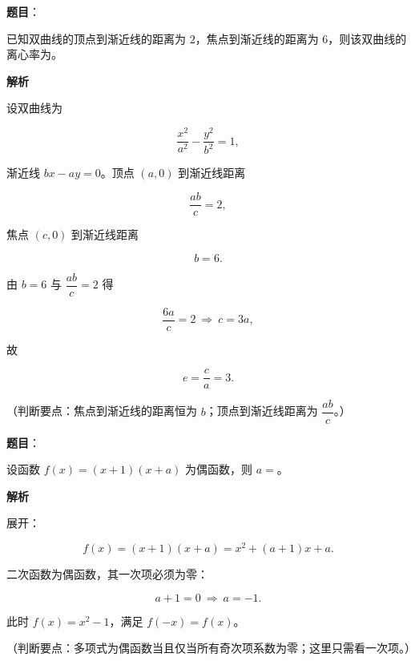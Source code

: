 \begin{answer}

\textbf{题目}：

已知双曲线的顶点到渐近线的距离为 $2$，焦点到渐近线的距离为 $6$，则该双曲线的离心率为\gkblank{}。

\textbf{解析}

设双曲线为

\nopagebreak[4]
\[\frac{x^2}{a^2}-\frac{y^2}{b^2}=1,\]

渐近线 $bx-ay=0$。顶点 $(a,0)$ 到渐近线距离

\nopagebreak[4]
\[\frac{ab}{c}=2,\]

焦点 $(c,0)$ 到渐近线距离

\nopagebreak[4]
\[b=6.\]

由 $b=6$ 与 $\dfrac{ab}{c}=2$ 得

\nopagebreak[4]
\[\frac{6a}{c}=2\ \Rightarrow\ c=3a,\]

故

\nopagebreak[4]
\[e=\frac ca=3.\]

（判断要点：焦点到渐近线的距离恒为 $b$；顶点到渐近线距离为 $\dfrac{ab}{c}$。）


\end{answer}
\begin{answer}

\textbf{题目}：

设函数 $f(x)=(x+1)(x+a)$ 为偶函数，则 $a=$\gkblank{}。

\textbf{解析}

展开：

\nopagebreak[4]
\[f(x)=(x+1)(x+a)=x^2+(a+1)x+a.\]

二次函数为偶函数，其一次项必须为零：

\nopagebreak[4]
\[a+1=0\ \Rightarrow\ a=-1.\]

此时 $f(x)=x^2-1$，满足 $f(-x)=f(x)$。

（判断要点：多项式为偶函数当且仅当所有奇次项系数为零；这里只需看一次项。）


\end{answer}
